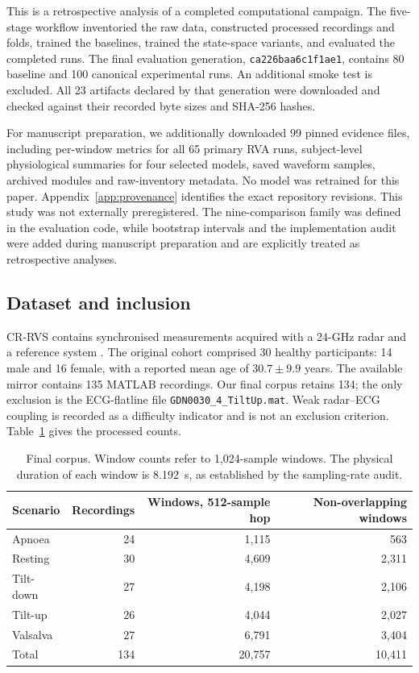 \documentclass[11pt,a4paper]{article}
\begin{document}
This is a retrospective analysis of a completed computational campaign. The five-stage workflow
inventoried the raw data, constructed processed recordings and folds, trained the baselines,
trained the state-space variants, and evaluated the completed runs. The final evaluation
generation, \texttt{ca226baa6c1f1ae1}, contains 80 baseline and 100 canonical experimental runs.
An additional smoke test is excluded. All 23 artifacts declared by that generation were
downloaded and checked against their recorded byte sizes and SHA-256 hashes.

For manuscript preparation, we additionally downloaded 99 pinned evidence files, including
per-window metrics for all 65 primary RVA runs, subject-level physiological summaries for
four selected models, saved waveform samples, archived modules and raw-inventory metadata. No model was retrained for
this paper. Appendix~\ref{app:provenance} identifies the exact repository revisions. This study
was not externally preregistered. The nine-comparison family was defined in the evaluation
code, while bootstrap intervals and the implementation audit were added during manuscript
preparation and are explicitly treated as retrospective analyses.

\subsection{Dataset and inclusion}

CR-RVS contains synchronised measurements acquired with a 24-GHz radar and a reference system
\citep{schellenberger2020}. The original cohort comprised 30 healthy participants: 14 male and
16 female, with a reported mean age of $30.7\pm9.9$ years. The available mirror contains 135
MATLAB recordings. Our final corpus retains 134; the only exclusion is the ECG-flatline file
\texttt{GDN0030\_4\_TiltUp.mat}. Weak radar--ECG coupling is recorded as a difficulty
indicator and is not an exclusion criterion. Table~\ref{tab:data} gives the processed counts.

\begin{table}[htbp]
\centering
\caption{Final corpus. Window counts refer to 1,024-sample windows. The physical duration of
each window is 8.192~s, as established by the sampling-rate audit.}
\label{tab:data}
\begin{tabular}{lrrr}\toprule
Scenario & Recordings & Windows, 512-sample hop & Non-overlapping windows\\\midrule
Apnoea & 24 & 1,115 & 563\\
Resting & 30 & 4,609 & 2,311\\
Tilt-down & 27 & 4,198 & 2,106\\
Tilt-up & 26 & 4,044 & 2,027\\
Valsalva & 27 & 6,791 & 3,404\\\midrule
Total & 134 & 20,757 & 10,411\\\bottomrule
\end{tabular}
\end{table}
\end{document}
